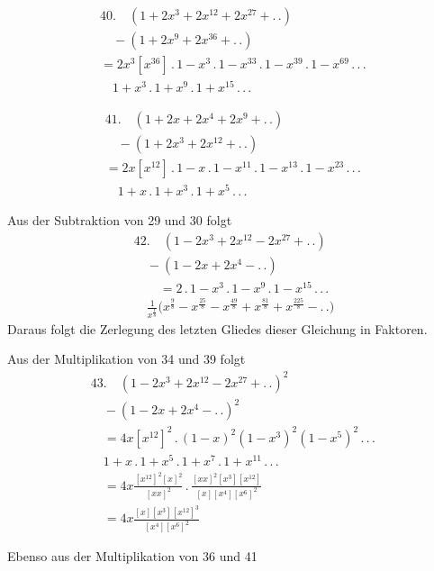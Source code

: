 \[
\begin{gathered}
40.\quad (1+2x^3+2x^{12}+2x^{27}+ .\,.)\\[8pt]\quad{}-(1+2x^9+2x^{36}+ .\,.)\\[8pt]
=2x^3[x^{36}]\,.\,1-x^3\,.\,1-x^{33}\,.\,1-x^{39}\,.\,1-x^{69}\,.\,.\,.\,\\[8pt]\quad{}
1+x^3\,.\,1+x^9\,.\,1+x^{15}\,.\,.\,.
\end{gathered}
\]

\[
\begin{gathered}
41.\quad (1+2x+2x^4+2x^9+ .\,.)\\[8pt]\quad{}-(1+2x^3+2x^{12}+ .\,.)\\[8pt]
=2x[x^{12}]\,.\,1-x\,.\,1-x^{11}\,.\,1-x^{13}\,.\,1-x^{23}\,.\,.\,.\,\\[8pt]\quad{}
1+x\,.\,1+x^3\,.\,1+x^5\,.\,.\,.
\end{gathered}
\]

Aus der Subtraktion von 29 und 30 folgt
\[
\begin{gathered}
42.\quad (1-2x^3+2x^{12}-2x^{27}+ .\,.)\\[8pt]\quad{}-(1-2x+2x^4- .\,.)\\[8pt]
\qquad=2\,.\,1-x^3\,.\,1-x^9\,.\,1-x^{15}\,.\,.\,.\,
\\[8pt]\quad{}\frac{1}{x^{\frac18}}\bigl(x^{\frac98}-x^{\frac{25}{8}}-x^{\frac{49}{8}}+x^{\frac{81}{8}}+x^{\frac{225}{8}}- .\,.\bigr)
\end{gathered}
\]
Daraus folgt die Zerlegung des letzten Gliedes dieser Gleichung in Faktoren.


Aus der Multiplikation von 34 und 39 folgt
\[
\begin{gathered}
43.\quad (1-2x^3+2x^{12}-2x^{27}+ .\,.)^2\\[8pt]\quad{}-(1-2x+2x^4- .\,.)^2\\[8pt]
\quad=4x[x^{12}]^2\,.\,(1-x)^2(1-x^3)^2(1-x^5)^2\,.\,.\,.\,\\[8pt]\quad{}
1+x\,.\,1+x^5\,.\,1+x^7\,.\,1+x^{11}\,.\,.\,.\\[8pt]
\quad=4x\frac{[x^{12}]^2[x]^2}{[xx]^2}\,.\,
\frac{[xx]^2[x^3][x^{12}]}{[x][x^4][x^6]^2}
\\[8pt]\quad{}=4x\frac{[x][x^3][x^{12}]^3}{[x^4][x^6]^2}
\end{gathered}
\]

Ebenso aus der Multiplikation von 36 und 41

